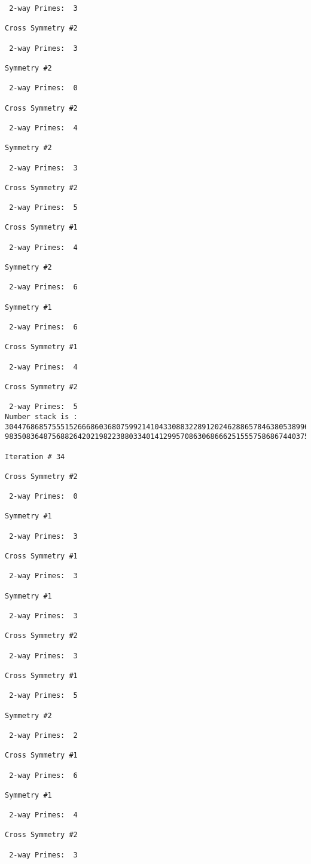 {{{{\begin{verbatim}
 2-way Primes: 	3

Cross Symmetry #2

 2-way Primes: 	3

Symmetry #2

 2-way Primes: 	0

Cross Symmetry #2

 2-way Primes: 	4

Symmetry #2

 2-way Primes: 	3

Cross Symmetry #2

 2-way Primes: 	5

Cross Symmetry #1

 2-way Primes: 	4

Symmetry #2

 2-way Primes: 	6

Symmetry #1

 2-way Primes: 	6

Cross Symmetry #1

 2-way Primes: 	4

Cross Symmetry #2

 2-way Primes: 	5
Number stack is :
30447686857555152666860368075992141043308832289120246288657846380538996794608835958544046240163340857
98350836487568826420219822388033401412995708630686662515557586867440375804336104264044585953880649769

Iteration #	34

Cross Symmetry #2

 2-way Primes: 	0

Symmetry #1

 2-way Primes: 	3

Cross Symmetry #1

 2-way Primes: 	3

Symmetry #1

 2-way Primes: 	3

Cross Symmetry #2

 2-way Primes: 	3

Cross Symmetry #1

 2-way Primes: 	5

Symmetry #2

 2-way Primes: 	2

Cross Symmetry #1

 2-way Primes: 	6

Symmetry #1

 2-way Primes: 	4

Cross Symmetry #2

 2-way Primes: 	3


\end{verbatim}}}}}
